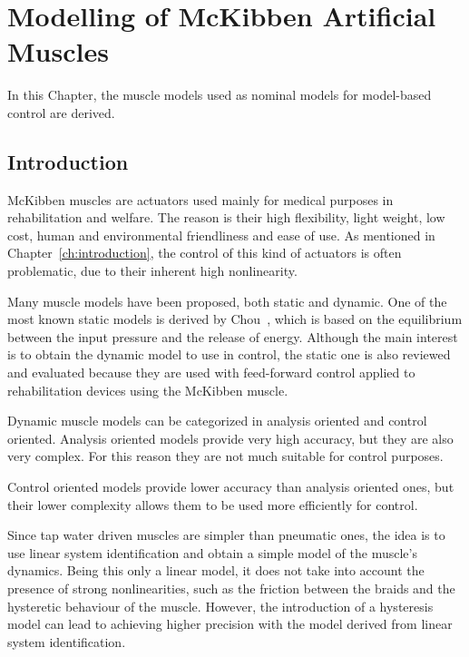 
\chapter{Modelling of McKibben Artificial Muscles}
\label{ch:model}

In this Chapter, the muscle models used as nominal models for model-based control are derived.

\section{Introduction}

McKibben muscles are actuators used mainly for medical purposes in rehabilitation and welfare. 
The reason is their high flexibility, light weight, low cost, human and environmental friendliness and ease of use.
As mentioned in Chapter~\ref{ch:introduction}, the control of this kind of actuators
is often problematic, due to their inherent high nonlinearity.

Many muscle models have been proposed, both static and dynamic.
One of the most known static models is derived by Chou~\cite{model_chou},
which is based on the equilibrium between the input pressure and the release of energy.
Although the main interest is to obtain the dynamic model to use in control, 
the static one is also reviewed and evaluated because they are used with feed-forward
control applied to rehabilitation devices using the McKibben muscle. 

Dynamic muscle models can be categorized in analysis oriented and control oriented.
Analysis oriented models provide very high accuracy, but they are also very complex.
For this reason they are not much suitable for control purposes.

Control oriented models provide lower accuracy than analysis oriented ones,
but their lower complexity allows them to be used more efficiently for control.


Since tap water driven muscles are simpler than pneumatic ones, the idea is to use
linear system identification and obtain a simple model of the muscle's dynamics.
Being this only a linear model,
it does not take into account the presence of strong nonlinearities,
such as the friction between the braids and the hysteretic behaviour of the muscle.
However, the introduction of a hysteresis model can lead to achieving higher precision
with the model derived from linear system identification.


